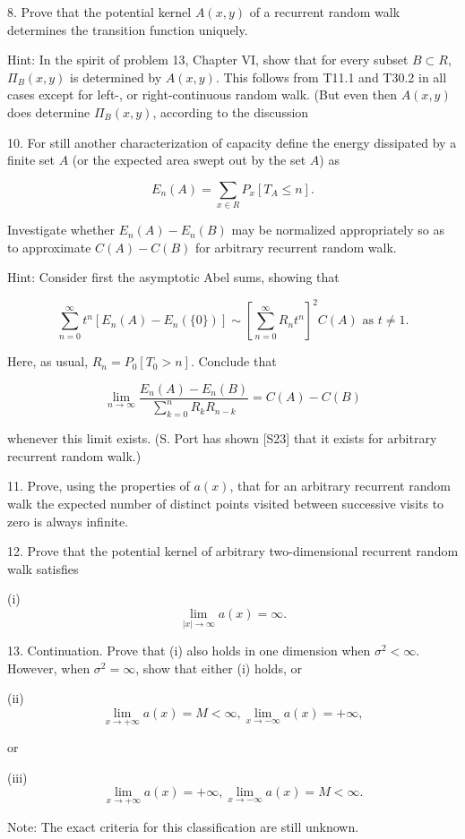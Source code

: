 8. Prove that the potential kernel $A(x,y)$ of a recurrent random walk determines the transition function uniquely.

Hint: In the spirit of problem 13, Chapter VI, show that for every subset $B \subset R$, $\Pi_B(x,y)$ is determined by $A(x,y)$. This follows from T11.1 and T30.2 in all cases except for left-, or right-continuous random walk. (But even then $A(x,y)$ does determine $\Pi_B(x,y)$, according to the discussion

10. For still another characterization of capacity define the energy dissipated by a finite set $A$ (or the expected area swept out by the set $A$) as

$$E_n(A) = \sum_{x \in R} P_x[T_A \leq n].$$

Investigate whether $E_n(A) - E_n(B)$ may be normalized appropriately so as to approximate $C(A) - C(B)$ for arbitrary recurrent random walk.

Hint: Consider first the asymptotic Abel sums, showing that

$$\sum_{n=0}^{\infty} t^n [E_n(A) - E_n(\{0\})] \sim \left[ \sum_{n=0}^{\infty} R_n t^n \right]^2 C(A) \text{ as } t \neq 1.$$

Here, as usual, $R_n = P_0[T_0 > n]$. Conclude that

$$\lim_{n \to \infty} \frac{E_n(A) - E_n(B)}{\sum_{k=0}^{n} R_k R_{n-k}} = C(A) - C(B)$$

whenever this limit exists. (S. Port has shown [S23] that it exists for arbitrary recurrent random walk.)

11. Prove, using the properties of $a(x)$, that for an arbitrary recurrent random walk the expected number of distinct points visited between successive visits to zero is always infinite.

12. Prove that the potential kernel of arbitrary two-dimensional recurrent random walk satisfies

(i) $$\lim_{|x| \to \infty} a(x) = \infty.$$

13. Continuation. Prove that (i) also holds in one dimension when $\sigma^2 < \infty$. However, when $\sigma^2 = \infty$, show that either (i) holds, or

(ii) $$\lim_{x \to +\infty} a(x) = M < \infty, \lim_{x \to -\infty} a(x) = +\infty,$$

or

(iii) $$\lim_{x \to +\infty} a(x) = +\infty, \lim_{x \to -\infty} a(x) = M < \infty.$$

Note: The exact criteria for this classification are still unknown.

